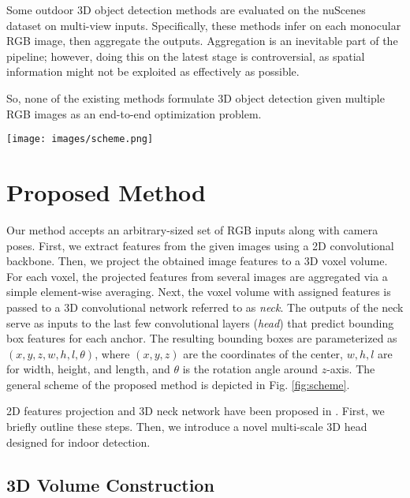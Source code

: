\documentclass[10pt,twocolumn,letterpaper]{article}
\begin{document}
Some outdoor 3D object detection methods \cite{simonelli2020disentangling, roddick2018orthographic} are evaluated on the nuScenes \cite{caesar2020nuscenes} dataset on multi-view inputs. Specifically, these methods infer on each monocular RGB image, then aggregate the outputs. Aggregation is an inevitable part of the pipeline; however, doing this on the latest stage is controversial, as spatial information might not be exploited as effectively as possible. 

So, none of the existing methods formulate 3D object detection given multiple RGB images as an end-to-end optimization problem.

\begin{figure*}
    \centering
        \texttt{[image: images/scheme.png]}
    \caption{The general scheme of the proposed ImVoxelNet. Dashed lines around network blocks denote that network weights are shared across multiple inputs.}
    \label{fig:scheme}
\end{figure*}

\section{Proposed Method}

Our method accepts an arbitrary-sized set of RGB inputs along with camera poses. First, we extract features from the given images using a 2D convolutional backbone. Then, we project the obtained image features to a 3D voxel volume. For each voxel, the projected features from several images are aggregated via a simple element-wise averaging. Next, the voxel volume with assigned features is passed to a 3D convolutional network referred to as \textit{neck}. The outputs of the neck serve as inputs to the last few convolutional layers (\textit{head}) that predict bounding box features for each anchor. The resulting bounding boxes are parameterized as $(x, y, z, w, h, l, \theta)$, where $(x, y, z)$ are the coordinates of the center, $w, h, l$ are for width, height, and length, and $\theta$ is the rotation angle around $z$-axis. The general scheme of the proposed method is depicted in Fig. \ref{fig:scheme}.

2D features projection and 3D neck network have been proposed in \cite{murez2020atlas, hou20193dsis}. First, we briefly outline these steps. Then, we introduce a novel multi-scale 3D head designed for indoor detection.

\subsection{3D Volume Construction}
\end{document}

